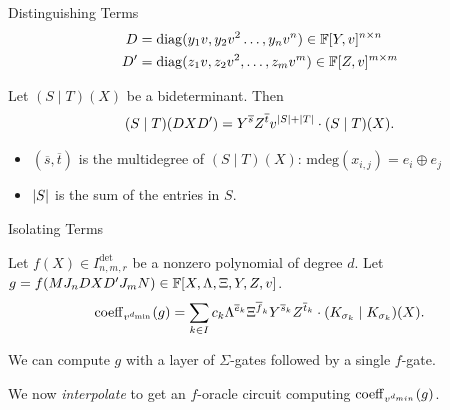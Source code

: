 \documentclass[aspectratio=169]{beamer}
\begin{document}
\begin{frame}{Distinguishing Terms}
  \begin{align*}
    D  &= \mathrm{diag}(y_1 v, y_2 v^2\dots,y_n v^n )\in\mathbb{F}[Y,v]^{n\times n} \\
    D' &= \mathrm{diag}(z_1 v,z_2 v^2,\dots,z_m v^m)\in\mathbb{F}[Z,v]^{m\times m}
  \end{align*}

  \pause

  \begin{lem}
    Let $(S\mid T)(X)$ be a bideterminant.
    Then
    \[
      (S\mid T)(D X D')=Y^{\overline{s}} Z^{\overline{t}} v^{\abs{S} + \abs{T}} \cdot (S\mid T)(X).
    \]
    \begin{itemize}
    \item $(\overline{s},\overline{t})$ is the multidegree of $(S\mid T)(X)$: $\mathrm{mdeg}(x_{i, j}) = e_i \oplus e_j$
    \item $\abs{S}$ is the sum of the entries in $S$.
    \end{itemize}
  \end{lem}
\end{frame}

\begin{frame}{Isolating Terms}
  \begin{lem}
    Let $f(X) \in I^{\det}_{n, m, r}$ be a nonzero polynomial of degree $d$.
    Let $g = f(M J_n D X D' J_m N) \in \mathbb{F}[X, \Lambda, \Xi, Y, Z, v]$.
    \[
      \operatorname{coeff}_{v^{d_{\min}}}(g) = \sum_{k\in I} c_k \Lambda^{\overline{e}_k}\Xi^{\overline{f}_k}Y^{\overline{s}_k}Z^{\overline{t}_k}\cdot (K_{\sigma_k}\mid K_{\sigma_k})(X).
    \]
  \end{lem}

  \pause

  We can compute $g$ with a layer of $\Sigma$-gates followed by a single $f$-gate.

  \pause
  \vspace{10pt}

  We now \emph{interpolate} to get an $f$-oracle circuit computing $\operatorname{coeff}_{v^{d_{min}}}(g)$.
\end{frame}
\end{document}

